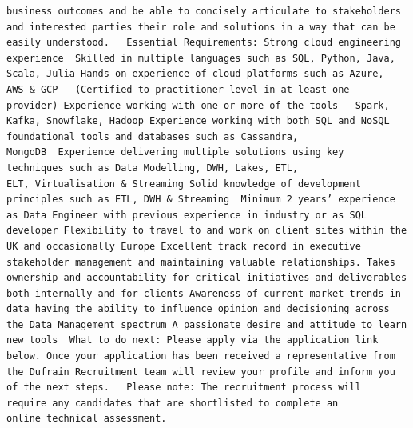 \documentclass[
]{article}
\begin{document}
\begin{verbatim}
business outcomes and be able to concisely articulate to stakeholders and interested parties their role and solutions in a way that can be easily understood.   Essential Requirements: Strong cloud engineering experience  Skilled in multiple languages such as SQL, Python, Java, Scala, Julia Hands on experience of cloud platforms such as Azure, AWS & GCP - (Certified to practitioner level in at least one provider) Experience working with one or more of the tools - Spark, Kafka, Snowflake, Hadoop Experience working with both SQL and NoSQL foundational tools and databases such as Cassandra, MongoDB  Experience delivering multiple solutions using key techniques such as Data Modelling, DWH, Lakes, ETL, ELT, Virtualisation & Streaming Solid knowledge of development principles such as ETL, DWH & Streaming  Minimum 2 years’ experience as Data Engineer with previous experience in industry or as SQL developer Flexibility to travel to and work on client sites within the UK and occasionally Europe Excellent track record in executive stakeholder management and maintaining valuable relationships. Takes ownership and accountability for critical initiatives and deliverables both internally and for clients Awareness of current market trends in data having the ability to influence opinion and decisioning across the Data Management spectrum A passionate desire and attitude to learn new tools  What to do next: Please apply via the application link below. Once your application has been received a representative from the Dufrain Recruitment team will review your profile and inform you of the next steps.   Please note: The recruitment process will require any candidates that are shortlisted to complete an online technical assessment.

\end{verbatim}
\end{document}
